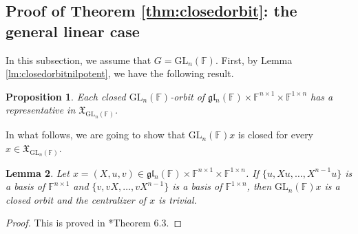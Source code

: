 \documentclass[12pt]{amsart}
\newtheorem{lm}{Lemma}[section]
\newtheorem{prop}[lm]{Proposition}
\theoremstyle{definition}
\theoremstyle{remark}\newtheorem{rmk}[lm]{Remark}
\newcommand{\GL}{{\mathrm{GL}}}
\newcommand{\rs}{\mathrm{s}}
\newcommand{\gl}{\mathfrak g \mathfrak l}
\newcommand{\fX}{\mathfrak X}
\newcommand{\C}{\mathbb{F}}
\begin{document}
	\subsection{Proof of Theorem \ref{thm:closedorbit}: the general linear case}
    In this subsection, we assume that $G=\GL_n(\C)$. First, by Lemma \ref{lm:closedorbitnilpotent}, we have the following result.
	\begin{prop}
		\label{prop:closedorbitnilpotentgln}
		Each closed $\GL_n(\C)$-orbit of $\gl_n(\C)\times\C^{n\times 1}\times\C^{1\times n}$ has a representative in $\fX_{\GL_n(\C)}$.
	\end{prop}
    
    In what follows, we are going to show that   $\GL_n(\C)x$ is  closed  for every $x\in\fX_{\GL_n(\C)}$.
    
	\begin{lm}
		\label{lm:regularsemisimplegln}
		Let $x=(X,u,v)\in\gl_n(\C)\times\C^{n\times 1}\times\C^{1\times n}$. If $\{u,Xu,\dots,X^{n-1}u\}$ is a basis of $\C^{n\times 1}$ and $\{v,vX,\dots,vX^{n-1}\}$ is a basis of $\C^{1\times n}$, then $\GL_n(\C)x$ is a closed orbit and the centralizer of $x$ is trivial.
	\end{lm}
	\begin{proof}
		This is proved in \cite{RS}*{Theorem 6.3}.
	\end{proof}
    
\end{document}
